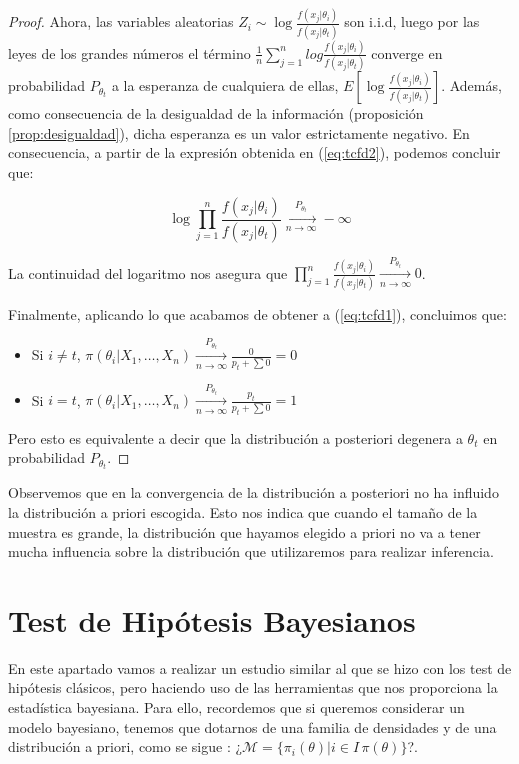 \documentclass{article}
\begin{document}
\begin{proof}
	Ahora, las variables aleatorias $Z_i \sim \log{\frac{f(x_j|\theta_i)}{f(x_j|\theta_t)}}$ son i.i.d, luego por las leyes de los grandes números el término $\frac{1}{n}\sum_{j=1}^{n}{log{\frac{f(x_j|\theta_i)}{f(x_j|\theta_t)}}}$ converge en probabilidad $P_{\theta_t}$ a la esperanza de cualquiera de ellas, $E\left[\log{\frac{f(x_j|\theta_i)}{f(x_j|\theta_t)}}\right]$. Además, como consecuencia de la desigualdad de la información (proposición \ref{prop:desigualdad}), dicha esperanza es un valor estrictamente negativo. En consecuencia, a partir de la expresión obtenida en (\ref{eq:tcfd2}), podemos concluir que:

	\[\log{\prod_{j=1}^n{\frac{f(x_j|\theta_i)}{f(x_j|\theta_t)}}} \xrightarrow[n\to\infty]{P_{\theta_t}} -\infty\]

	La continuidad del logaritmo nos asegura que $\prod_{j=1}^n{\frac{f(x_j|\theta_i)}{f(x_j|\theta_t)}} \xrightarrow[n\to\infty]{P_{\theta_t}} 0$.

	Finalmente, aplicando lo que acabamos de obtener a (\ref{eq:tcfd1}), concluimos que:

	\begin{itemize}
		\item Si $i \ne t$, $\pi(\theta_i|X_1,\dots,X_n) \xrightarrow[n\to\infty]{P_{\theta_t}} \frac{0}{p_t+\sum{0}} = 0$
		\item Si $i = t$, $\pi(\theta_i|X_1,\dots,X_n) \xrightarrow[n\to\infty]{P_{\theta_t}} \frac{p_t}{p_t+\sum{0}} = 1$
	\end{itemize}

	Pero esto es equivalente a decir que la distribución a posteriori degenera a $\theta_t$ en probabilidad $P_{\theta_t}$.
\end{proof}

\begin{remark}
	Observemos que en la convergencia de la distribución a posteriori no ha influido la distribución a priori escogida. Esto nos indica que cuando el tamaño de la muestra es grande, la distribución que hayamos elegido a priori no va a tener mucha influencia sobre la distribución que utilizaremos para realizar inferencia.
\end{remark}

\pagebreak

\section{Test de Hipótesis Bayesianos} \label{sec:bayes:hipotesis}

En este apartado vamos a realizar un estudio similar al que se hizo con los test de hipótesis clásicos, pero haciendo uso de las herramientas que nos proporciona la estadística bayesiana. Para ello, recordemos que si queremos considerar un modelo bayesiano, tenemos que dotarnos de una familia de densidades y de una distribución a priori, como se sigue : ¿$\mathcal{M} = \{\pi_i(\theta)|i\in I\, \pi(\theta)\}$?.
\end{document}
